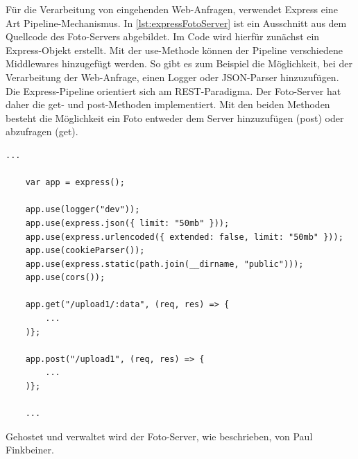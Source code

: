 Für die Verarbeitung von eingehenden Web-Anfragen, verwendet Express eine Art Pipeline-Mechanismus. In \autoref{lst:expressFotoServer} ist ein Ausschnitt aus dem Quellcode des Foto-Servers abgebildet. Im Code wird hierfür zunächst ein Express-Objekt erstellt. Mit der use-Methode können der Pipeline verschiedene Middlewares hinzugefügt werden. So gibt es zum Beispiel die Möglichkeit, bei der Verarbeitung der Web-Anfrage, einen Logger oder JSON-Parser hinzuzufügen. Die Express-Pipeline orientiert sich am REST-Paradigma. Der Foto-Server hat daher die get- und post-Methoden implementiert. Mit den beiden Methoden besteht die Möglichkeit ein Foto entweder dem Server hinzuzufügen (post) oder abzufragen (get).

\begin{lstlisting}[label=lst:expressFotoServer, caption={Codeausschnitt aus dem Foto-Server}, captionpos=b]
    ...

    var app = express();

    app.use(logger("dev"));
    app.use(express.json({ limit: "50mb" }));
    app.use(express.urlencoded({ extended: false, limit: "50mb" }));
    app.use(cookieParser());
    app.use(express.static(path.join(__dirname, "public")));
    app.use(cors());

    app.get("/upload1/:data", (req, res) => {
        ...
    )};

    app.post("/upload1", (req, res) => {
        ...
    )};

    ...
\end{lstlisting}

Gehostet und verwaltet wird der Foto-Server, wie beschrieben, von Paul Finkbeiner. 